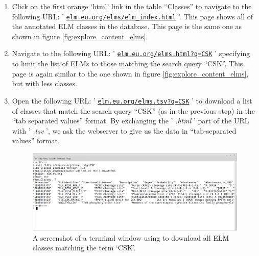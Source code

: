 \documentclass[12pt]{article}
\newcommand\rurl[1]{%
	\href{http://#1}{\nolinkurl{#1}}%
}
\newcommand\fileformat[1]{%
    \textit{#1}{}%
}%
\begin{document}
\begin{enumerate}
\item Click on the first orange `html' link in the table ``Classes'' to
	navigate to the following URL:
	'\rurl{elm.eu.org/elms/elm\_index.html}'. This page shows all of the
	annotated ELM classes in the database. This page is the same one as
	shown in figure \ref{fig:explore_content_elms}.

\item Navigate to the following URL: '\rurl{elm.eu.org/elms.html?q=CSK}'
	specifying  to limit the list of ELMs to those matching the
	search query ``CSK''. This page is again similar to the one shown in
	figure \ref{fig:explore_content_elms}, but with less classes.



\item Open the following URL: '\rurl{elm.eu.org/elms.tsv?q=CSK}' to download a
	list of classes that match the search query ``CSK'' (as in the previous
	step) in the ``tab separated values'' format. By exchanging the
	'\fileformat{.html}' part of the URL with '\fileformat{.tsv}', we ask the
	webserver to give us the data in ``tab-separated values'' format.


\begin{figure}[h!]
	\centering
	\includegraphics[width=\textwidth]{Figures/search_REST/elm_curl_classes_CSK.png}
	\caption{
	A screenshot of a terminal window using
	 to download all ELM classes matching the term `CSK'.
	}
	\label{fig:search_REST_curl_csk}
\end{figure}


\end{enumerate}
\end{document}
